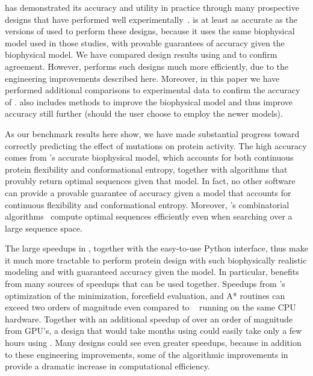 \osprey has demonstrated its accuracy and utility in practice through many prospective designs that have performed well experimentally~\cite{VRC07_enhance,CFTR,runx1_cbfb,GrsA-LeuA,DHFR-PNAS,GrsA-TyrA,specific_probes}.   is at least as accurate as the versions of \osprey used to perform these designs, because it uses the same biophysical model used in those studies, with provable guarantees of accuracy given the biophysical model.  We have compared design results using  and  to confirm agreement.  However,  performs such designs much more efficiently, due to the engineering improvements described here.  Moreover, in this paper we have performed additional comparisons to experimental data to confirm the accuracy of .   also includes methods to improve the biophysical model and thus improve accuracy still further (should the user choose to employ the newer models). 

As our benchmark results here show, we have made substantial progress toward correctly predicting the effect of mutations on protein activity.  The high accuracy comes from \osprey's accurate biophysical model, which accounts for both continuous protein flexibility and conformational entropy, together with algorithms that provably return optimal sequences given that model.  In fact, no other software can provide a provable guarantee of accuracy given a model that accounts for continuous flexibility and conformational entropy.  Moreover, \osprey's combinatorial algorithms~\cite{alg_SMB_textbook,cosb_design} compute optimal sequences efficiently even when searching over a large sequence space.  

The large speedups in , together with the easy-to-use Python interface, thus make it much more tractable to perform protein design with such biophysically realistic modeling and with guaranteed accuracy given the model.  In particular,  benefits from many sources of speedups that can be used together.  Speedups from 's optimization of the minimization, forcefield evaluation, and A* routines can exceed two orders of magnitude even compared to ~\cite{COMETS} running on the same CPU hardware.  Together with an additional speedup of over an order of magnitude from GPU's, a design that would take months using  could easily take only a few hours using .  Many designs could see even greater speedups, because in addition to these engineering improvements, some of the algorithmic improvements in  provide a dramatic increase in computational efficiency.  

